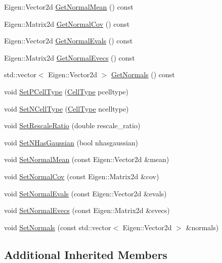 \begin{DoxyCompactItemize}
Eigen\+::\+Vector2d \hyperlink{classSNDTCell_a7d8e809d38f44a7f2d0efe44af390680}{Get\+Normal\+Mean} () const
\item 
Eigen\+::\+Matrix2d \hyperlink{classSNDTCell_ae91704f179f9c610ebeebb2fc06e1236}{Get\+Normal\+Cov} () const
\item 
Eigen\+::\+Vector2d \hyperlink{classSNDTCell_aed8a9e840286d4ac69447fa25c3be2e3}{Get\+Normal\+Evals} () const
\item 
Eigen\+::\+Matrix2d \hyperlink{classSNDTCell_a030b5ddd00d4e1aea413081fc52aa5b4}{Get\+Normal\+Evecs} () const
\item 
std\+::vector$<$ Eigen\+::\+Vector2d $>$ \hyperlink{classSNDTCell_ad8fbc8a667577b4c3d8c697f4fe6187b}{Get\+Normals} () const
\item 
void \hyperlink{classSNDTCell_a24f8966d1a574ebd12f1290fec08aa88}{Set\+P\+Cell\+Type} (\hyperlink{classSNDTCell_a89f320f167cfeb7ccdbb4a578a169341}{Cell\+Type} pcelltype)
\item 
void \hyperlink{classSNDTCell_a826cb5085a4f419ccb9b39e6a45590bf}{Set\+N\+Cell\+Type} (\hyperlink{classSNDTCell_a89f320f167cfeb7ccdbb4a578a169341}{Cell\+Type} ncelltype)
\item 
void \hyperlink{classSNDTCell_ad53148612767d089b246e6658f0f630f}{Set\+Rescale\+Ratio} (double rescale\+\_\+ratio)
\item 
void \hyperlink{classSNDTCell_a5a6be9eb1c086f893f9cf8f5996a9246}{Set\+N\+Has\+Gaussian} (bool nhasgaussian)
\item 
void \hyperlink{classSNDTCell_a74b8aeb8fd01791aeb0b64efd538713e}{Set\+Normal\+Mean} (const Eigen\+::\+Vector2d \&mean)
\item 
void \hyperlink{classSNDTCell_ab814a0908068fa7d17821d8824b1f811}{Set\+Normal\+Cov} (const Eigen\+::\+Matrix2d \&cov)
\item 
void \hyperlink{classSNDTCell_aa807ca6733a7ed315ef55f9a9bd52db6}{Set\+Normal\+Evals} (const Eigen\+::\+Vector2d \&evals)
\item 
void \hyperlink{classSNDTCell_a90543f67d8bd2dc40ff26f56d0056d44}{Set\+Normal\+Evecs} (const Eigen\+::\+Matrix2d \&evecs)
\item 
void \hyperlink{classSNDTCell_a1c8a5478d1cae57f3f169afb25d18fc3}{Set\+Normals} (const std\+::vector$<$ Eigen\+::\+Vector2d $>$ \&normals)
\end{DoxyCompactItemize}
\subsection*{Additional Inherited Members}


